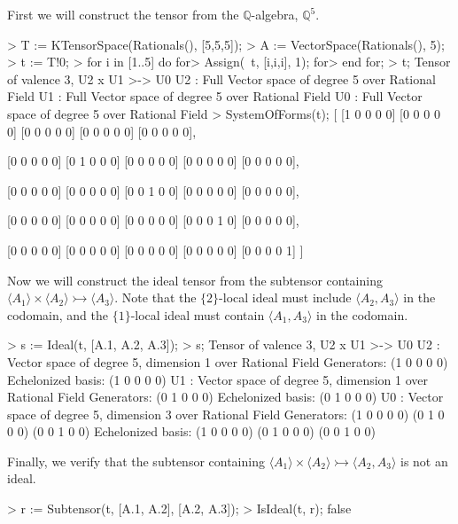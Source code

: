 \begin{example}[Ideals]

First we will construct the tensor from the $\mathbb{Q}$-algebra, $\mathbb{Q}^5$. 
\begin{code}
> T := KTensorSpace(Rationals(), [5,5,5]);
> A := VectorSpace(Rationals(), 5);
> t := T!0;
> for i in [1..5] do
for>   Assign(~t, [i,i,i], 1);
for> end for;
> t;
Tensor of valence 3, U2 x U1 >-> U0
U2 : Full Vector space of degree 5 over Rational Field
U1 : Full Vector space of degree 5 over Rational Field
U0 : Full Vector space of degree 5 over Rational Field
> SystemOfForms(t);
[
    [1 0 0 0 0]
    [0 0 0 0 0]
    [0 0 0 0 0]
    [0 0 0 0 0]
    [0 0 0 0 0],

    [0 0 0 0 0]
    [0 1 0 0 0]
    [0 0 0 0 0]
    [0 0 0 0 0]
    [0 0 0 0 0],

    [0 0 0 0 0]
    [0 0 0 0 0]
    [0 0 1 0 0]
    [0 0 0 0 0]
    [0 0 0 0 0],

    [0 0 0 0 0]
    [0 0 0 0 0]
    [0 0 0 0 0]
    [0 0 0 1 0]
    [0 0 0 0 0],

    [0 0 0 0 0]
    [0 0 0 0 0]
    [0 0 0 0 0]
    [0 0 0 0 0]
    [0 0 0 0 1]
]
\end{code}

Now we will construct the ideal tensor from the subtensor containing $\langle A_1\rangle \times \langle A_2\rangle \rightarrowtail \langle A_3\rangle$. 
Note that the $\{2\}$-local ideal must include $\langle A_2,A_3\rangle$ in the codomain, and the $\{1\}$-local ideal must contain $\langle A_1,A_3\rangle$ in the codomain. 
\begin{code}
> s := Ideal(t, [A.1, A.2, A.3]);
> s;
Tensor of valence 3, U2 x U1 >-> U0
U2 : Vector space of degree 5, dimension 1 over Rational Field
Generators:
(1 0 0 0 0)
Echelonized basis:
(1 0 0 0 0)
U1 : Vector space of degree 5, dimension 1 over Rational Field
Generators:
(0 1 0 0 0)
Echelonized basis:
(0 1 0 0 0)
U0 : Vector space of degree 5, dimension 3 over Rational Field
Generators:
(1 0 0 0 0)
(0 1 0 0 0)
(0 0 1 0 0)
Echelonized basis:
(1 0 0 0 0)
(0 1 0 0 0)
(0 0 1 0 0)
\end{code}

Finally, we verify that the subtensor containing $\langle A_1\rangle \times \langle A_2\rangle \rightarrowtail \langle A_2, A_3\rangle$ is not an ideal. 
\begin{code}
> r := Subtensor(t, [A.1, A.2], [A.2, A.3]);
> IsIdeal(t, r);
false
\end{code}
\end{example}

